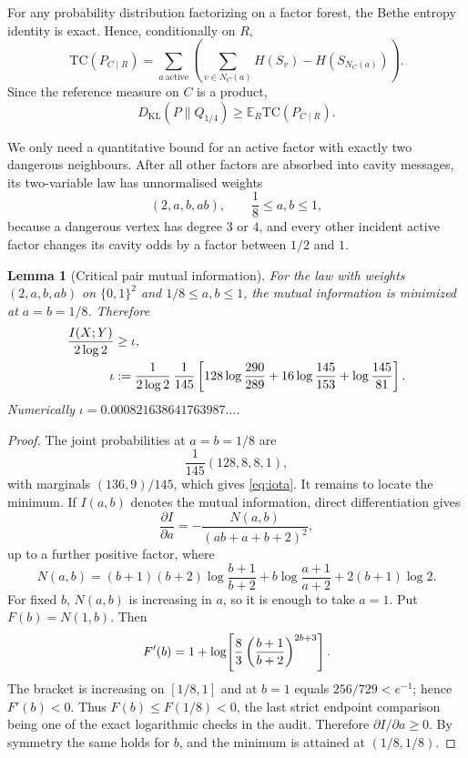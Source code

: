 \documentclass[11pt]{article}
\newtheorem{lemma}[theorem]{Lemma}
\newcommand{\E}{\mathbb E}
\newcommand{\TC}{\mathrm{TC}}
\begin{document}
For any probability distribution factorizing on a factor forest, the Bethe entropy identity is exact.  Hence, conditionally on $R$,
\begin{equation}\label{eq:bethe}
 \TC(P_{C\mid R})
 =\sum_{a\ \mathrm{active}}
 \left(\sum_{v\in N_C(a)}H(S_v)-H(S_{N_C(a)})\right).
\end{equation}
Since the reference measure on $C$ is a product,
\begin{equation}\label{eq:KLTC}
 D_{\mathrm{KL}}(P\|Q_{1/4})
 \ge \E_R\TC(P_{C\mid R}).
\end{equation}

We only need a quantitative bound for an active factor with exactly two dangerous neighbours.
After all other factors are absorbed into cavity messages, its two-variable law has unnormalised weights
\[
 (2,a,b,ab),
 \qquad
 \frac18\le a,b\le1,
\]
because a dangerous vertex has degree $3$ or $4$, and every other incident active factor changes its cavity odds by a factor between $1/2$ and $1$.

\begin{lemma}[Critical pair mutual information]\label{lem:iota}
For the law with weights $(2,a,b,ab)$ on $\{0,1\}^2$ and $1/8\le a,b\le1$, the mutual information is minimized at $a=b=1/8$.  Therefore
\begin{align}
 \frac{I(X;Y)}{2\log2}
 &\ge \iota,\label{eq:iota-bound}\\
 \iota
 &:={1\over2\log2}\,{1\over145}
 \left[
 128\log{290\over289}
 +16\log{145\over153}
 +\log{145\over81}
 \right].\label{eq:iota}
\end{align}
Numerically $\iota=0.000821638641763987\ldots$.
\end{lemma}

\begin{proof}
The joint probabilities at $a=b=1/8$ are
\[
 \frac1{145}(128,8,8,1),
\]
with marginals $(136,9)/145$, which gives \eqref{eq:iota}.
It remains to locate the minimum.  If $I(a,b)$ denotes the mutual information, direct differentiation gives
\[
 \frac{\partial I}{\partial a}
 =-\frac{N(a,b)}{(ab+a+b+2)^2},
\]
up to a further positive factor, where
\[
 N(a,b)
 =(b+1)(b+2)\log\frac{b+1}{b+2}
 +b\log\frac{a+1}{a+2}
 +2(b+1)\log2.
\]
For fixed $b$, $N(a,b)$ is increasing in $a$, so it is enough to take $a=1$.  Put $F(b)=N(1,b)$.  Then
\[
 F'(b)
 =1+\log\!\left[
 {8\over3}\left({b+1\over b+2}\right)^{2b+3}
 \right].
\]
The bracket is increasing on $[1/8,1]$ and at $b=1$ equals $256/729<e^{-1}$; hence $F'(b)<0$.  Thus $F(b)\le F(1/8)<0$, the last strict endpoint comparison being one of the exact logarithmic checks in the audit.  Therefore $\partial I/\partial a\ge0$.  By symmetry the same holds for $b$, and the minimum is attained at $(1/8,1/8)$.
\end{proof}
\end{document}
